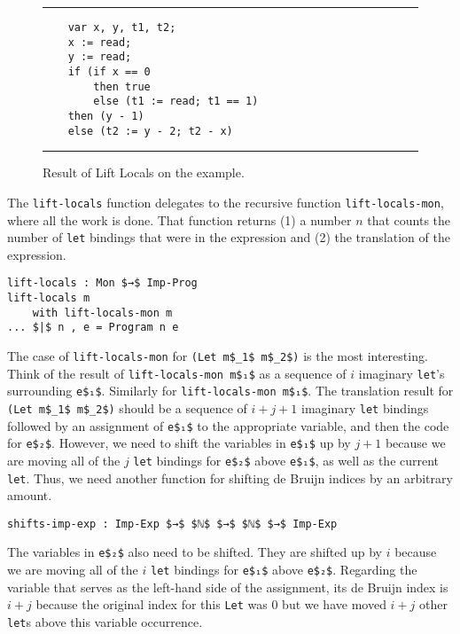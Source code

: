 \documentclass[sigplan,review,dvipsnames,screen,10pt]{acmart}
\begin{document}
\begin{figure}[tp]
  \hrule
\begin{lstlisting}
    var x, y, t1, t2;
    x := read;
    y := read;
    if (if x == 0
        then true
        else (t1 := read; t1 == 1)
    then (y - 1)
    else (t2 := y - 2; t2 - x)
\end{lstlisting}
  \hrule
  \caption{Result of Lift Locals on the example.}
  \label{fig:running-example-structured-imperative}
\end{figure}
The \lstinline{lift-locals} function delegates to the recursive
function \lstinline{lift-locals-mon}, where all the work is done.
That function returns (1) a number $n$ that counts the number of
\lstinline{let} bindings that were in the expression and (2) the
translation of the expression.

\begin{lstlisting}
lift-locals : Mon $→$ Imp-Prog
lift-locals m
    with lift-locals-mon m
... $|$ n , e = Program n e    
\end{lstlisting}

\noindent The case of \lstinline{lift-locals-mon} for \lstinline{(Let m$_1$ m$_2$)}
is the most interesting. Think of the result of
\lstinline{lift-locals-mon m$₁$} as a sequence of $i$ imaginary
\lstinline{let}'s surrounding \lstinline{e$₁$}. Similarly for
\lstinline{lift-locals-mon m$₁$}.  The translation result for
\lstinline{(Let m$_1$ m$_2$)} should be a sequence of $i + j + 1$ imaginary
\lstinline{let} bindings followed by an assignment of \lstinline{e$₁$} to
the appropriate variable, and then the code for
\lstinline{e$₂$}. However, we need to shift the variables in
\lstinline{e$₁$} up by $j + 1$ because we are moving all of the $j$
\lstinline{let} bindings for \lstinline{e$₂$} above \lstinline{e$₁$}, as well
as the current \lstinline{let}. Thus, we need another function for
shifting de Bruijn indices by an arbitrary amount.

\begin{lstlisting}
shifts-imp-exp : Imp-Exp $→$ $ℕ$ $→$ $ℕ$ $→$ Imp-Exp
\end{lstlisting}

The variables in \lstinline{e$₂$} also need to be shifted.  They are
shifted up by $i$ because we are moving all of the $i$
\lstinline{let} bindings for \lstinline{e$₁$} above
\lstinline{e$₂$}. Regarding the variable that serves as the left-hand
side of the assignment, its de Bruijn index is $i + j$ because the
original index for this \lstinline{Let} was $0$ but we have moved $i +
j$ other \lstinline{let}s above this variable occurrence.
\end{document}
